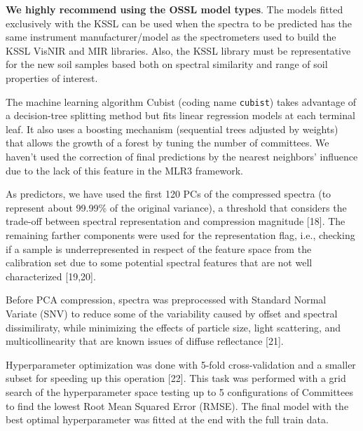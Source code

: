\documentclass[
  letterpaper,
  DIV=11,
  numbers=noendperiod]{scrreprt}
\begin{document}
\begin{tcolorbox}[enhanced jigsaw, title=\textcolor{quarto-callout-tip-color}{\faLightbulb}\hspace{0.5em}{Tip}, rightrule=.15mm, coltitle=black, opacityback=0, bottomrule=.15mm, colframe=quarto-callout-tip-color-frame, breakable, arc=.35mm, titlerule=0mm, toptitle=1mm, left=2mm, colback=white, toprule=.15mm, leftrule=.75mm, bottomtitle=1mm, opacitybacktitle=0.6, colbacktitle=quarto-callout-tip-color!10!white]

\textbf{We highly recommend using the OSSL model types}. The models
fitted exclusively with the KSSL can be used when the spectra to be
predicted has the same instrument manufacturer/model as the
spectrometers used to build the KSSL VisNIR and MIR libraries. Also, the
KSSL library must be representative for the new soil samples based both
on spectral similarity and range of soil properties of interest.

\end{tcolorbox}

The machine learning algorithm Cubist (coding name \texttt{cubist})
takes advantage of a decision-tree splitting method but fits linear
regression models at each terminal leaf. It also uses a boosting
mechanism (sequential trees adjusted by weights) that allows the growth
of a forest by tuning the number of committees. We haven't used the
correction of final predictions by the nearest neighbors' influence due
to the lack of this feature in the MLR3 framework.

As predictors, we have used the first 120 PCs of the compressed spectra
(to represent about 99.99\% of the original variance), a threshold that
considers the trade-off between spectral representation and compression
magnitude {[}18{]}. The remaining farther components were used for the
representation flag, i.e., checking if a sample is underrepresented in
respect of the feature space from the calibration set due to some
potential spectral features that are not well characterized {[}19,20{]}.

Before PCA compression, spectra was preprocessed with Standard Normal
Variate (SNV) to reduce some of the variability caused by offset and
spectral dissimiliraty, while minimizing the effects of particle size,
light scattering, and multicollinearity that are known issues of diffuse
reflectance {[}21{]}.

Hyperparameter optimization was done with 5-fold cross-validation and a
smaller subset for speeding up this operation {[}22{]}. This task was
performed with a grid search of the hyperparameter space testing up to 5
configurations of Committees to find the lowest Root Mean Squared Error
(RMSE). The final model with the best optimal hyperparameter was fitted
at the end with the full train data.
\end{document}

